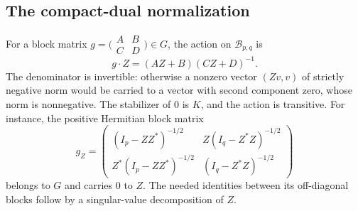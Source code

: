 \subsection{The compact-dual normalization}

For a block matrix
$g=\bigl(\begin{smallmatrix}A&B\\C&D\end{smallmatrix}\bigr)\in G$,
the action on $\mathcal B_{p,q}$ is
\[
                 g\cdot Z=(AZ+B)(CZ+D)^{-1}.
\]
The denominator is invertible: otherwise a nonzero vector
$(Zv,v)$ of strictly negative norm would be carried to a
vector with second component zero, whose norm is nonnegative.
The stabilizer of $0$ is $K$, and the action is transitive.
For instance, the positive Hermitian block matrix
\[
 g_Z=
 \begin{pmatrix}
 (I_p-ZZ^*)^{-1/2}&Z(I_q-Z^*Z)^{-1/2}\\
 Z^*(I_p-ZZ^*)^{-1/2}&(I_q-Z^*Z)^{-1/2}
 \end{pmatrix}
 \tag{FD2}
\]
belongs to $G$ and carries $0$ to $Z$. The needed identities
between its off-diagonal blocks follow by a singular-value
decomposition of $Z$.

